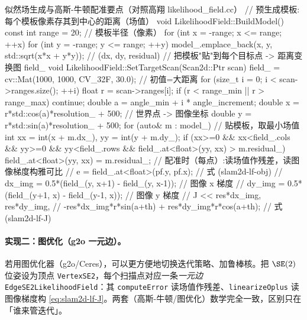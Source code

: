 \begin{codebox}[C++]{似然场生成与高斯-牛顿配准要点（对照高翔 likelihood\_field.cc）}
// 预生成模板:每个模板像素存其到中心的距离（场值）
void LikelihoodField::BuildModel() {
  const int range = 20;                  // 模板半径（像素）
  for (int x = -range; x <= range; ++x)
    for (int y = -range; y <= range; ++y)
      model_.emplace_back(x, y, std::sqrt(x*x + y*y)); // (dx, dy, residual)
}
// 把模板"贴"到每个目标点 -> 距离变换图 field_
void LikelihoodField::SetTargetScan(Scan2d::Ptr scan) {
  field_ = cv::Mat(1000, 1000, CV_32F, 30.0);          // 初值=大距离
  for (size_t i = 0; i < scan->ranges.size(); ++i) {
    float r = scan->ranges[i]; if (r < range_min || r > range_max) continue;
    double a = angle_min + i * angle_increment;
    double x = r*std::cos(a)*resolution_ + 500;        // 世界点 -> 图像坐标
    double y = r*std::sin(a)*resolution_ + 500;
    for (auto& m : model_) {                            // 贴模板，取最小场值
      int xx = int(x + m.dx_), yy = int(y + m.dy_);
      if (xx>=0 && xx<field_.cols && yy>=0 && yy<field_.rows
          && field_.at<float>(yy, xx) > m.residual_)
        field_.at<float>(yy, xx) = m.residual_;
    }
  }
}
// 配准时（每点）:读场值作残差，读图像梯度构雅可比
// e        = field_.at<float>(pf.y, pf.x);              // 式 (slam2d-lf-obj)
// dx_img   = 0.5*(field_(y, x+1) - field_(y, x-1));     // 图像 x 梯度
// dy_img   = 0.5*(field_(y+1, x) - field_(y-1, x));     // 图像 y 梯度
// J << res*dx_img, res*dy_img,
//      -res*dx_img*r*sin(a+th) + res*dy_img*r*cos(a+th); // 式 (slam2d-lf-J)
\end{codebox}

\paragraph{实现二：图优化（g2o 一元边）。}
若用图优化器（g2o/Ceres），可以更方便地切换迭代策略、加鲁棒核。把 $\SE(2)$ 位姿设为顶点 \texttt{VertexSE2}，每个扫描点对应一条\emph{一元边} \texttt{EdgeSE2LikelihoodField}：其 \texttt{computeError} 读场值作残差、\texttt{linearizeOplus} 读图像梯度构 \cref{eq:slam2d-lf-J}。两套（高斯-牛顿/图优化）数学完全一致，区别只在「谁来管迭代」。


